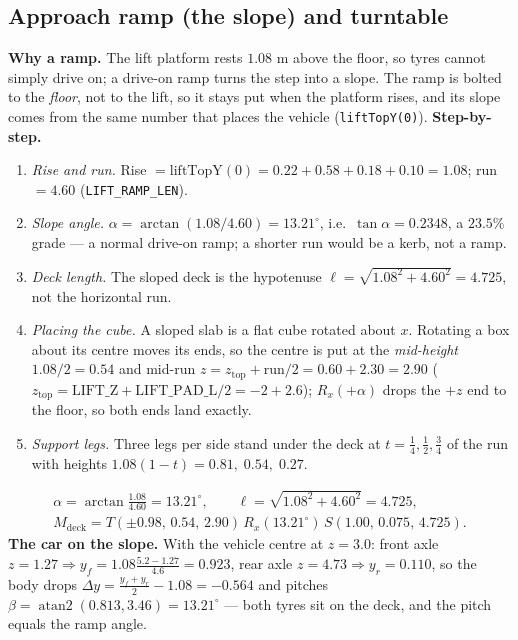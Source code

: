 \documentclass[10pt,a4paper]{article}
\newcommand{\fn}[1]{\texttt{#1}}
\begin{document}
\subsection{Approach ramp (the slope) and turntable}\label{sec:ramp}
\textbf{Why a ramp.} The lift platform rests $1.08$ m above the floor, so tyres cannot simply drive on; a drive-on ramp turns the step into a slope. The ramp is bolted to the \emph{floor}, not to the lift, so it stays put when the
platform rises, and its slope comes from the same number that places the vehicle (\fn{liftTopY(0)}).
\textbf{Step-by-step.}
\begin{enumerate}[leftmargin=*,label=\textbf{\arabic*.}]
\item \emph{Rise and run.} Rise $=\text{liftTopY}(0)=0.22+0.58+0.18+0.10=1.08$; run $=4.60$ (\fn{LIFT\_RAMP\_LEN}).
\item \emph{Slope angle.} $\alpha=\arctan(1.08/4.60)=13.21^\circ$, i.e.\ $\tan\alpha=0.2348$, a $23.5\%$ grade --- a normal drive-on ramp; a shorter run would be a kerb, not a ramp.
\item \emph{Deck length.} The sloped deck is the hypotenuse $\ell=\sqrt{1.08^2+4.60^2}=4.725$, not the horizontal run.
\item \emph{Placing the cube.} A sloped slab is a flat cube rotated about $x$. Rotating a box about its centre moves its ends, so the centre is put at the \emph{mid-height} $1.08/2=0.54$ and mid-run
$z=z_{\text{top}}+\text{run}/2=0.60+2.30=2.90$ ($z_{\text{top}}=\text{LIFT\_Z}+\text{LIFT\_PAD\_L}/2=-2+2.6$); $R_x(+\alpha)$ drops the $+z$ end to the floor, so both ends land exactly.
\item \emph{Support legs.} Three legs per side stand under the deck at $t=\tfrac14,\tfrac12,\tfrac34$ of the run with heights $1.08(1-t)=0.81,\;0.54,\;0.27$.
\end{enumerate}
\begin{equation}\begin{gathered}\alpha=\arctan\frac{1.08}{4.60}=13.21^\circ,\qquad \ell=\sqrt{1.08^2+4.60^2}=4.725,\\
M_{\text{deck}}=T(\pm0.98,\,0.54,\,2.90)\,R_x(13.21^\circ)\,S(1.00,\,0.075,\,4.725).\end{gathered}\label{eq:ramp}\end{equation}
\textbf{The car on the slope.} With the vehicle centre at $z=3.0$: front axle $z=1.27\Rightarrow y_f=1.08\frac{5.2-1.27}{4.6}=0.923$, rear axle $z=4.73\Rightarrow y_r=0.110$, so the body
drops $\Delta y=\frac{y_f+y_r}{2}-1.08=-0.564$ and pitches $\beta=\operatorname{atan2}(0.813,3.46)=13.21^\circ$ --- both tyres sit on the deck, and the pitch equals the ramp angle.
\end{document}
